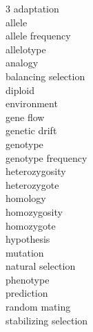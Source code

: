 
\begin{multicols}{3}
adaptation \\
allele \\
allele frequency \\
allelotype \\
analogy \\
balancing selection \\
diploid \\
environment \\
gene flow \\
genetic drift \\
genotype \\
genotype frequency \\
heterozygosity \\
heterozygote \\
homology \\
homozygosity \\
homozygote \\
hypothesis \\
mutation \\
natural selection \\
phenotype \\
prediction \\
random mating \\
stabilizing selection \\
\end{multicols}
